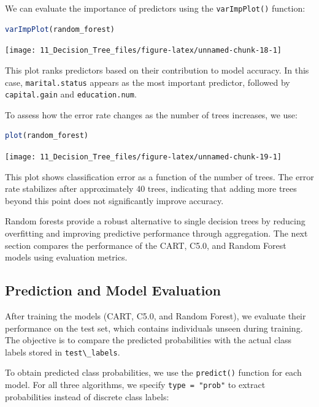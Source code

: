 \documentclass[
  11pt,
]{book}
\newcommand{\passthrough}[1]{#1}
\theoremstyle{definition}
\theoremstyle{definition}
\theoremstyle{definition}
\theoremstyle{definition}
\theoremstyle{remark}
\begin{document}
We can evaluate the importance of predictors using the \passthrough{\lstinline!varImpPlot()!} function:

\begin{lstlisting}[language=R]
varImpPlot(random_forest)
\end{lstlisting}

\begin{center}\texttt{[image: 11\_Decision\_Tree\_files/figure-latex/unnamed-chunk-18-1]} \end{center}

This plot ranks predictors based on their contribution to model accuracy. In this case, \passthrough{\lstinline!marital.status!} appears as the most important predictor, followed by \passthrough{\lstinline!capital.gain!} and \passthrough{\lstinline!education.num!}.

To assess how the error rate changes as the number of trees increases, we use:

\begin{lstlisting}[language=R]
plot(random_forest)
\end{lstlisting}

\begin{center}\texttt{[image: 11\_Decision\_Tree\_files/figure-latex/unnamed-chunk-19-1]} \end{center}

This plot shows classification error as a function of the number of trees. The error rate stabilizes after approximately 40 trees, indicating that adding more trees beyond this point does not significantly improve accuracy.

Random forests provide a robust alternative to single decision trees by reducing overfitting and improving predictive performance through aggregation. The next section compares the performance of the CART, C5.0, and Random Forest models using evaluation metrics.

\subsection*{Prediction and Model Evaluation}\label{prediction-and-model-evaluation-1}


After training the models (CART, C5.0, and Random Forest), we evaluate their performance on the test set, which contains individuals unseen during training. The objective is to compare the predicted probabilities with the actual class labels stored in \passthrough{\lstinline!test\_labels!}.

To obtain predicted class probabilities, we use the \passthrough{\lstinline!predict()!} function for each model. For all three algorithms, we specify \passthrough{\lstinline!type = "prob"!} to extract probabilities instead of discrete class labels:
\end{document}
